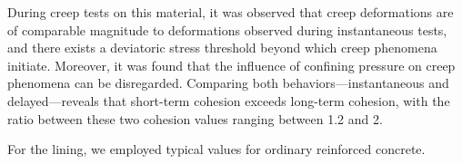 \documentclass[a4paper,fleqn]{cas-sc}
\begin{document}
During creep tests on this material, it was observed that creep deformations are of comparable magnitude to deformations observed during instantaneous tests, and there exists a deviatoric stress threshold beyond which creep phenomena initiate. Moreover, it was found that the influence of confining pressure on creep phenomena can be disregarded. Comparing both behaviors—instantaneous and delayed—reveals that short-term cohesion exceeds long-term cohesion, with the ratio between these two cohesion values ranging between 1.2 and 2.





For the lining, we employed typical values for ordinary reinforced concrete. 
\end{document}
